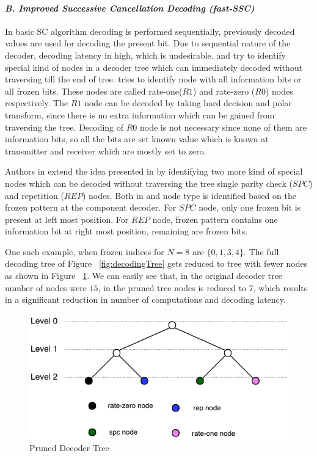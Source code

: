 \paragraph{\emph{B. Improved Successive Cancellation Decoding (fast-SSC)}\newline}  \label{fastSSC} 
In basic SC algorithm decoding is performed sequentially, previously decoded values are used for decoding the present bit. Due to sequential nature of the decoder, decoding latency in high, which is undesirable. \cite{SSC} and \cite{fastSSC} try to identify special kind of nodes in a decoder tree which can immediately decoded without traversing till the end of tree. \cite{SSC} tries to identify node with all information bits or all frozen bits. These nodes are called rate-one($R1$) and rate-zero ($R0$) nodes respectively. The $R1$ node can be decoded by taking hard decision and polar transform, since there is no extra information which can be gained from traversing the tree. Decoding of $R0$ node is not necessary since none of them are information bits, so all the bits are set known value which is known at transmitter and receiver which are mostly set to zero. \par Authors in \cite{fastSSC} extend the idea presented in \cite{SSC} by identifying two more kind of special nodes which can be decoded without traversing the tree single parity check ($SPC$) and repetition ($REP$) nodes. Both in \cite{SSC} and \cite{fastSSC} node type is identified based on the frozen pattern at the component decoder. For $SPC$ node, only one frozen bit is present at left most position. For $REP$ node, frozen pattern contains one information bit at right most position, remaining are frozen bits.

One such example, when frozen indices for $N = 8$ are $\{0,1,3,4\}$. The full decoding tree of Figure ~\ref{fig:decodingTree} gets reduced to tree with fewer nodes as shown in Figure ~\ref{fig:decodingTreePruned}. We can easily see that, in the original decoder tree number of nodes were $15$, in the pruned tree nodes is reduced to 7, which results in a significant reduction in number of computations and decoding latency.

\begin{figure}[h]
	\centering
	\includegraphics{./figures/decodingTreePruned.pdf}
	\caption{Pruned Decoder Tree}
	\label{fig:decodingTreePruned}
\end{figure}


